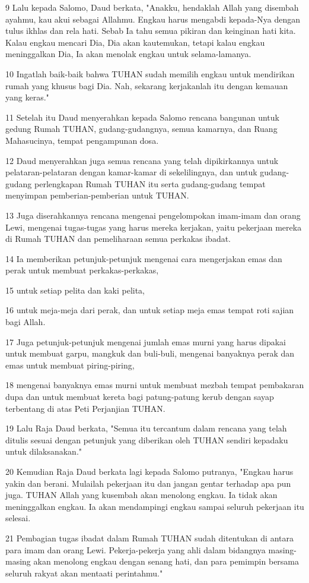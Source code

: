 \par 9 Lalu kepada Salomo, Daud berkata, "Anakku, hendaklah Allah yang disembah ayahmu, kau akui sebagai Allahmu. Engkau harus mengabdi kepada-Nya dengan tulus ikhlas dan rela hati. Sebab Ia tahu semua pikiran dan keinginan hati kita. Kalau engkau mencari Dia, Dia akan kautemukan, tetapi kalau engkau meninggalkan Dia, Ia akan menolak engkau untuk selama-lamanya.
\par 10 Ingatlah baik-baik bahwa TUHAN sudah memilih engkau untuk mendirikan rumah yang khusus bagi Dia. Nah, sekarang kerjakanlah itu dengan kemauan yang keras."
\par 11 Setelah itu Daud menyerahkan kepada Salomo rencana bangunan untuk gedung Rumah TUHAN, gudang-gudangnya, semua kamarnya, dan Ruang Mahasucinya, tempat pengampunan dosa.
\par 12 Daud menyerahkan juga semua rencana yang telah dipikirkannya untuk pelataran-pelataran dengan kamar-kamar di sekelilingnya, dan untuk gudang-gudang perlengkapan Rumah TUHAN itu serta gudang-gudang tempat menyimpan pemberian-pemberian untuk TUHAN.
\par 13 Juga diserahkannya rencana mengenai pengelompokan imam-imam dan orang Lewi, mengenai tugas-tugas yang harus mereka kerjakan, yaitu pekerjaan mereka di Rumah TUHAN dan pemeliharaan semua perkakas ibadat.
\par 14 Ia memberikan petunjuk-petunjuk mengenai cara mengerjakan emas dan perak untuk membuat perkakas-perkakas,
\par 15 untuk setiap pelita dan kaki pelita,
\par 16 untuk meja-meja dari perak, dan untuk setiap meja emas tempat roti sajian bagi Allah.
\par 17 Juga petunjuk-petunjuk mengenai jumlah emas murni yang harus dipakai untuk membuat garpu, mangkuk dan buli-buli, mengenai banyaknya perak dan emas untuk membuat piring-piring,
\par 18 mengenai banyaknya emas murni untuk membuat mezbah tempat pembakaran dupa dan untuk membuat kereta bagi patung-patung kerub dengan sayap terbentang di atas Peti Perjanjian TUHAN.
\par 19 Lalu Raja Daud berkata, "Semua itu tercantum dalam rencana yang telah ditulis sesuai dengan petunjuk yang diberikan oleh TUHAN sendiri kepadaku untuk dilaksanakan."
\par 20 Kemudian Raja Daud berkata lagi kepada Salomo putranya, "Engkau harus yakin dan berani. Mulailah pekerjaan itu dan jangan gentar terhadap apa pun juga. TUHAN Allah yang kusembah akan menolong engkau. Ia tidak akan meninggalkan engkau. Ia akan mendampingi engkau sampai seluruh pekerjaan itu selesai.
\par 21 Pembagian tugas ibadat dalam Rumah TUHAN sudah ditentukan di antara para imam dan orang Lewi. Pekerja-pekerja yang ahli dalam bidangnya masing-masing akan menolong engkau dengan senang hati, dan para pemimpin bersama seluruh rakyat akan mentaati perintahmu."

